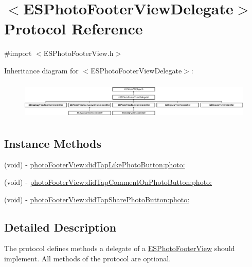 \hypertarget{protocol_e_s_photo_footer_view_delegate-p}{}\section{$<$E\+S\+Photo\+Footer\+View\+Delegate$>$ Protocol Reference}
\label{protocol_e_s_photo_footer_view_delegate-p}


{\ttfamily \#import $<$E\+S\+Photo\+Footer\+View.\+h$>$}

Inheritance diagram for $<$E\+S\+Photo\+Footer\+View\+Delegate$>$\+:\begin{figure}[H]
\begin{center}
\leavevmode
\includegraphics[height=1.828571cm]{protocol_e_s_photo_footer_view_delegate-p}
\end{center}
\end{figure}
\subsection*{Instance Methods}
\begin{DoxyCompactItemize}
\item 
(void) -\/ \hyperlink{protocol_e_s_photo_footer_view_delegate-p_a69fc1180ccf1dd0b8939dccede2cfe8d}{photo\+Footer\+View\+:did\+Tap\+Like\+Photo\+Button\+:photo\+:}
\item 
(void) -\/ \hyperlink{protocol_e_s_photo_footer_view_delegate-p_afd507cefc5e691232a53322911945187}{photo\+Footer\+View\+:did\+Tap\+Comment\+On\+Photo\+Button\+:photo\+:}
\item 
(void) -\/ \hyperlink{protocol_e_s_photo_footer_view_delegate-p_ad8dda9f60e8647b3ec1dde000814b291}{photo\+Footer\+View\+:did\+Tap\+Share\+Photo\+Button\+:photo\+:}
\end{DoxyCompactItemize}


\subsection{Detailed Description}
The protocol defines methods a delegate of a \hyperlink{interface_e_s_photo_footer_view}{E\+S\+Photo\+Footer\+View} should implement. All methods of the protocol are optional. 

